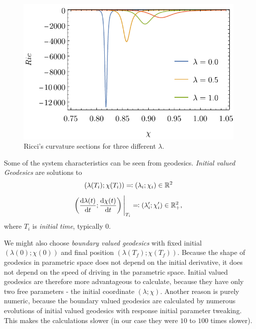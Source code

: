 \begin{figure}[H]
    \centering
    \includegraphics[scale=0.9]{../img/N=3_Ricci_section.pdf}
    \caption{Ricci's curvature sections for three different $\lambda$.}
    \label{fig:N=3_Ricci_section}
\end{figure}

Some of the system characteristics can be seen from geodesics. \emph{Initial valued Geodesics} are solutions to
$$(\lambda(T_i);\chi(T_i))\eqqcolon (\lambda_i;\chi_i)\in \mathbb{R}^2$$
$$\left(\frac{\mathrm{d} \lambda(t)}{\mathrm{d} t};\frac{\mathrm{d} \chi(t)}{\mathrm{d} t}\right)\Bigg|_{T_i} \eqqcolon (\lambda'_i;\chi'_i) \in \mathbb{R}^2_+,$$
where $T_i$ is \emph{initial time}, typically $0$. 

We might also choose \emph{boundary valued geodesics} with fixed initial $(\lambda(0);\chi(0))$ and final position $(\lambda(T_f);\chi(T_f))$. Because the shape of geodesics in parametric space does not depend on the initial derivative, it does not depend on the speed of driving in the parametric space. Initial valued geodesics are therefore more advantageous to calculate, because they have only two free parameters - the initial coordinate $(\lambda;\chi)$. Another reason is purely numeric, because the boundary valued geodesics are calculated by numerous evolutions of initial valued geodesics with response initial parameter tweaking. This makes the calculations slower (in our case they were $10$ to $100$ times slower).

